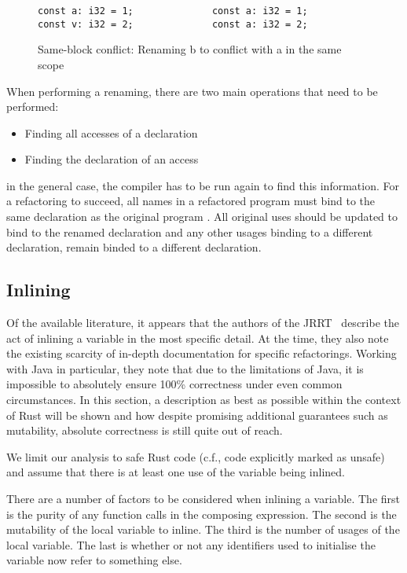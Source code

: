 \begin{figure}[h]
\begin{verbatim}
const a: i32 = 1;              const a: i32 = 1;
const v: i32 = 2;              const a: i32 = 2;
\end{verbatim}
\caption{Same-block conflict: Renaming b to conflict with a in the same scope}
\label{Fig:same}
\end{figure}

When performing a renaming, there are two main operations that need to be performed:
\begin{itemize}
\item Finding all accesses of a declaration
\item Finding the declaration of an access
\end{itemize}

in the general case, the compiler has to be run again to find this information. For a refactoring to succeed, all names in a refactored program must bind to the same declaration as the original program \cite{schafer2010specification}. All original uses should be updated to bind to the renamed declaration and any other usages binding to a different declaration, remain binded to a different declaration.

\subsection{Inlining}

Of the available literature, it appears that the authors of the JRRT~\cite{schafer2010specification} describe the act of inlining a variable in the most specific detail. At the time, they also note the existing scarcity of in-depth documentation for specific refactorings. Working with Java in particular, they note that due to the limitations of Java, it is impossible to absolutely ensure 100\% correctness under even common circumstances. In this section, a description as best as possible within the context of Rust will be shown and how despite promising additional guarantees such as mutability, absolute correctness is still quite out of reach.

We limit our analysis to safe Rust code (c.f., code explicitly marked as unsafe) and assume that there is at least one use of the variable being inlined.

There are a number of factors to be considered when inlining a variable. The first is the purity of any function calls in the composing expression. The second is the mutability of the local variable to inline. The third is the number of usages of the local variable. The last is whether or not any identifiers used to initialise the variable now refer to something else.


